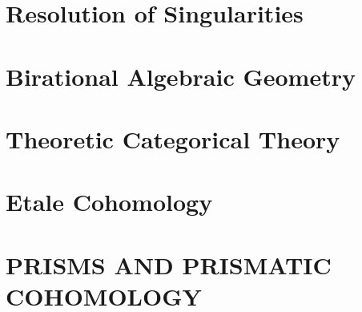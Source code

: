 \documentclass{ModulEN}
\begin{document}
	\part{Resolution of Singularities}
	
		
	
	\part{Birational Algebraic Geometry}
	\part{Theoretic Categorical Theory}
	\part{Etale Cohomology}
	\part{PRISMS AND PRISMATIC COHOMOLOGY}
	
	
\end{document}
